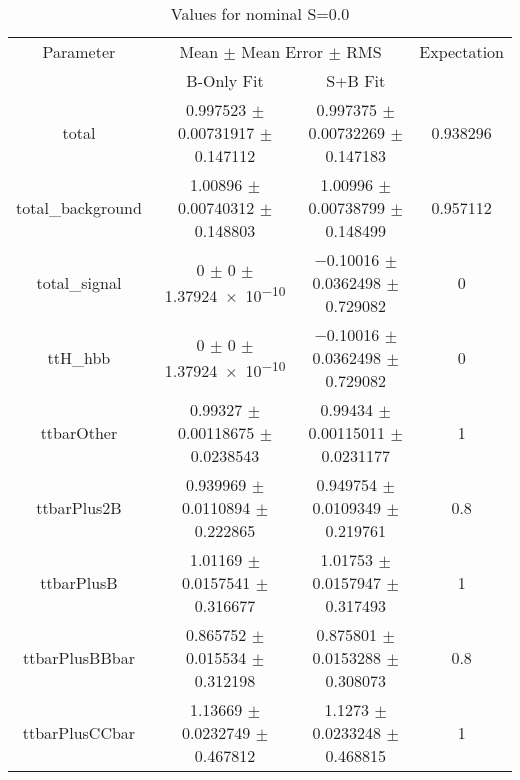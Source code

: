 \begin{table}
\centering
\caption{Values for nominal S=0.0}
\begin{tabular}{cccc}
\toprule
Parameter & \multicolumn{2}{c}{Mean $\pm$ Mean Error $\pm$ RMS} & Expectation\\
 & B-Only Fit & S+B Fit & \\
\midrule
total & \num{0.997523} $\pm$ \num{0.00731917} $\pm$ \num{0.147112} & \num{0.997375} $\pm$ \num{0.00732269} $\pm$ \num{0.147183} & \num{0.938296}\\
total\_background & \num{1.00896} $\pm$ \num{0.00740312} $\pm$ \num{0.148803} & \num{1.00996} $\pm$ \num{0.00738799} $\pm$ \num{0.148499} & \num{0.957112}\\
total\_signal & \num{0} $\pm$ \num{0} $\pm$ \num{1.37924e-10} & \num{-0.10016} $\pm$ \num{0.0362498} $\pm$ \num{0.729082} & \num{0}\\
ttH\_hbb & \num{0} $\pm$ \num{0} $\pm$ \num{1.37924e-10} & \num{-0.10016} $\pm$ \num{0.0362498} $\pm$ \num{0.729082} & \num{0}\\
ttbarOther & \num{0.99327} $\pm$ \num{0.00118675} $\pm$ \num{0.0238543} & \num{0.99434} $\pm$ \num{0.00115011} $\pm$ \num{0.0231177} & \num{1}\\
ttbarPlus2B & \num{0.939969} $\pm$ \num{0.0110894} $\pm$ \num{0.222865} & \num{0.949754} $\pm$ \num{0.0109349} $\pm$ \num{0.219761} & \num{0.8}\\
ttbarPlusB & \num{1.01169} $\pm$ \num{0.0157541} $\pm$ \num{0.316677} & \num{1.01753} $\pm$ \num{0.0157947} $\pm$ \num{0.317493} & \num{1}\\
ttbarPlusBBbar & \num{0.865752} $\pm$ \num{0.015534} $\pm$ \num{0.312198} & \num{0.875801} $\pm$ \num{0.0153288} $\pm$ \num{0.308073} & \num{0.8}\\
ttbarPlusCCbar & \num{1.13669} $\pm$ \num{0.0232749} $\pm$ \num{0.467812} & \num{1.1273} $\pm$ \num{0.0233248} $\pm$ \num{0.468815} & \num{1}\\
\bottomrule
\end{tabular}
\end{table}